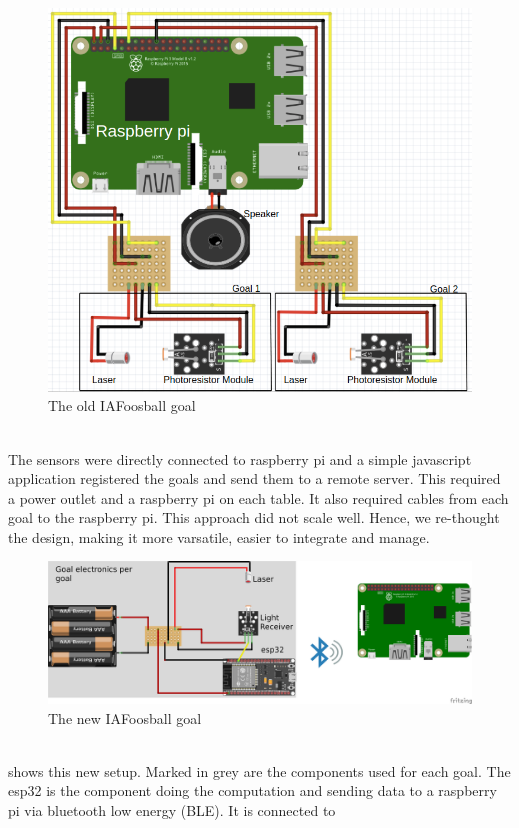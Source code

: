 \begin{figure}[h!]
    \centering
    \includegraphics[scale=0.3]{figures/goal-old.png}%
    \caption{The old IAFoosball goal}\label{fig:goalOld}
\end{figure}\\
The sensors were directly connected to raspberry pi and a simple javascript application registered the goals and send them to a remote server. This required a power outlet and a raspberry pi on each table. It also required cables from each goal to the raspberry pi. This approach did not scale well. Hence, we re-thought the design, making it more varsatile, easier to integrate and manage. 
\begin{figure}[h!]
    \centering
    \includegraphics[scale=0.3]{figures/goal-new.png}%
    \caption{The new IAFoosball goal}\label{fig:goalNew}
\end{figure}\\
 shows this new setup. Marked in grey are the components used for each goal. The esp32 is the component doing the computation and sending data to a raspberry pi via bluetooth low energy (BLE). It is connected to 